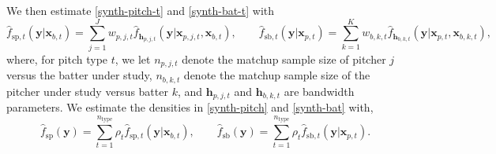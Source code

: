 \documentclass[12pt]{article}
\newcommand{\y}{\textbf{y}}
\newcommand{\x}{\textbf{x}}
\newcommand{\h}{\textbf{h}}
\begin{document}
We then estimate \eqref{synth-pitch-t} and \eqref{synth-bat-t} with
\begin{equation} \label{synth-est-t}
  \hat f_{\text{sp},t}(\y|\x_{b,t}) = \sum_{j=1}^J w_{p,j,t}\hat f_{\h_{p,j,t}}(\y|\x_{p,j,t},\x_{b,t}), 
  \qquad
  \hat f_{\text{sb}, t}(\y|\x_{p,t}) = \sum_{k=1}^K w_{b,k,t}\hat f_{\h_{b,k,t}}(\y|\x_{p,t},\x_{b,k,t}),
\end{equation}
where, for pitch type $t$, we let $n_{p,j,t}$ denote the matchup sample size of pitcher $j$ versus the batter under study, $n_{b,k,t}$ denote the matchup sample size of the pitcher under study versus batter $k$, and $\h_{p,j,t}$ and $\h_{b,k,t}$ are bandwidth parameters. We estimate the densities in \eqref{synth-pitch} and \eqref{synth-bat} with,
\begin{equation} \label{synth-est}
  \hat f_{\text{sp}}(\y) =  \sum_{t=1}^{n_{\text{type}}} \rho_t \hat f_{\text{sp}, t}(\y|\x_{b,t}),
  \qquad
  \hat f_{\text{sb}}(\y) = \sum_{t=1}^{n_{\text{type}}} \rho_t 
    \hat f_{\text{sb}, t}(\y|\x_{p,t}).
\end{equation}
\end{document}
